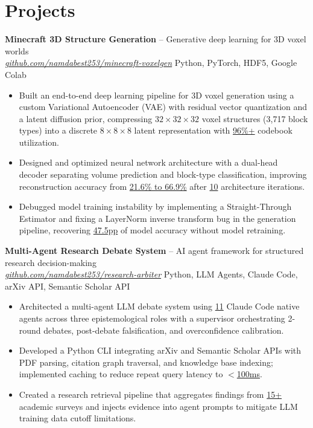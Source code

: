 \documentclass[10pt]{article}
\begin{document}
\section*{Projects}

\textbf{Minecraft 3D Structure Generation} -- Generative deep learning for 3D voxel worlds\\
\href{https://github.com/namdabest253/minecraft-voxelgen}{\textit{github.com/namdabest253/minecraft-voxelgen}} \textbar{} Python, PyTorch, HDF5, Google Colab
\vspace*{-0.5em}
\begin{itemize}
    \item Built an end-to-end deep learning pipeline for 3D voxel generation using a custom Variational Autoencoder (VAE) with residual vector quantization and a latent diffusion prior, compressing $32\times32\times32$ voxel structures (3,717 block types) into a discrete $8\times8\times8$ latent representation with \underline{96\%+} codebook utilization.
    
    \item Designed and optimized neural network architecture with a dual-head decoder separating volume prediction and block-type classification, improving reconstruction accuracy from \underline{21.6\% to 66.9\%} after \underline{10} architecture iterations.
    
    \item Debugged model training instability by implementing a Straight-Through Estimator and fixing a LayerNorm inverse transform bug in the generation pipeline, recovering \underline{47.5pp} of model accuracy without model retraining.
\end{itemize}

\textbf{Multi-Agent Research Debate System} -- AI agent framework for structured research decision-making\\
\href{https://github.com/namdabest253/research-arbiter}{\textit{github.com/namdabest253/research-arbiter}} \textbar{} Python, LLM Agents, Claude Code, arXiv API, Semantic Scholar API
\vspace*{-0.5em}
\begin{itemize}
    \item Architected a multi-agent LLM debate system using \underline{11} Claude Code native agents across three epistemological roles with a supervisor orchestrating 2-round debates, post-debate falsification, and overconfidence calibration.
    
    \item Developed a Python CLI integrating arXiv and Semantic Scholar APIs with PDF parsing, citation graph traversal, and knowledge base indexing; implemented caching to reduce repeat query latency to \underline{$<$100ms}.
    
    \item Created a research retrieval pipeline that aggregates findings from \underline{15+} academic surveys and injects evidence into agent prompts to mitigate LLM training data cutoff limitations.
\end{itemize}
\end{document}

